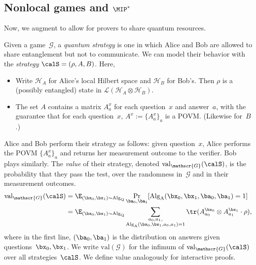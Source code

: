 \documentclass[11pt]{article}
\newcommand{\game}{\mathscr{G}}
\newcommand{\val}[1]{\mathrm{val}(#1)}
\newcommand{\valstrat}[2]{\mathrm{val}_{#1}(#2)}
\begin{document}
\subsection{Nonlocal games and $\MIP^*$}

Now, we augment 
to allow for provers to share quantum resources.

\begin{definition}
Given a game~$\game$, a \emph{quantum strategy}
is one in which Alice and Bob are allowed to share entanglement but not to communicate.
We can model their behavior with the \emph{strategy} $\calS= (\rho, A, B)$.
Here,
\begin{itemize}
\itemsep -.5pt
\item[$\circ$] Write $\mathcal{H}_A$ for Alice's local Hilbert space and $\mathcal{H}_B$ for Bob's.
		Then $\rho$ is a (possibly entangled) state in $\mathcal{L}(\mathcal{H}_A \otimes \mathcal{H}_B)$.
\item[$\circ$] The set $A$ contains a matrix $A_a^x$ for each question~$x$ and answer~$a$,
		with the guarantee that for each question~$x$, $A^x := \{A_a^x\}_a$ is a POVM. (Likewise for~$B$.)
\end{itemize} 
Alice and Bob perform their strategy as follows:
given question~$x$, Alice performs the POVM $\{A_a^x\}_a$ and returns her measurement outcome to the verifier.
Bob plays similarly.
The \emph{value} of their strategy, denoted $\valstrat{\game}{\calS}$, is the probability that they pass the test,
over the randomness in~$\game$ and in their measurement outcomes.
\begin{align*}
\valstrat{\game}{\calS}
&= \E_{(\bx_0, \bx_1) \sim \mathrm{Alg}_{\mathrm{Q}}} \Pr_{\ba_0, \ba_1}[\mathrm{Alg}_{\mathrm{A}}(\bx_0, \bx_1, \ba_0, \ba_1) = 1]\\
&= \E_{(\bx_0, \bx_1) \sim \mathrm{Alg}_{\mathrm{Q}}} \sum_{\substack{a_0, a_1,\\\mathrm{Alg}_{\mathrm{A}}(\bx_0, \bx_1, a_0, a_1) = 1}}
	\tr(A_{a_0}^{\bx_0} \otimes A_{a_1}^{\bx_1} \cdot \rho),
\end{align*}
where in the first line, $(\ba_0, \ba_1)$ is the distribution on answers given questions~$\bx_0, \bx_1$.
We write $\val{\game}$ for the infimum of $\valstrat{\game}{\calS}$ over all strategies~$\calS$.
We define value analogously for interactive proofs.


\end{definition}
\end{document}
